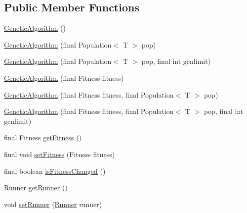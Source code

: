 \subsection*{Public Member Functions}
\begin{CompactItemize}
\item 
\hyperlink{classjenes_1_1_genetic_algorithm_3_01_t_01extends_01_chromosome_01_4_cfda239e0d2154eb26a7be4f6aa1315d}{GeneticAlgorithm} ()
\item 
\hyperlink{classjenes_1_1_genetic_algorithm_3_01_t_01extends_01_chromosome_01_4_ede3d2fbd3c3d1cf04a4e419649cae93}{GeneticAlgorithm} (final Population$<$ T $>$ pop)
\item 
\hyperlink{classjenes_1_1_genetic_algorithm_3_01_t_01extends_01_chromosome_01_4_fe0501230c1645d2a6cdf54af2672639}{GeneticAlgorithm} (final Population$<$ T $>$ pop, final int genlimit)
\item 
\hyperlink{classjenes_1_1_genetic_algorithm_3_01_t_01extends_01_chromosome_01_4_efcf45276a730906c98ff8de90b6c48e}{GeneticAlgorithm} (final Fitness fitness)
\item 
\hyperlink{classjenes_1_1_genetic_algorithm_3_01_t_01extends_01_chromosome_01_4_08a57814b09412baed3146d2cc6e2174}{GeneticAlgorithm} (final Fitness fitness, final Population$<$ T $>$ pop)
\item 
\hyperlink{classjenes_1_1_genetic_algorithm_3_01_t_01extends_01_chromosome_01_4_f3997e737162629c161c04a65dd830a0}{GeneticAlgorithm} (final Fitness fitness, final Population$<$ T $>$ pop, final int genlimit)
\item 
final Fitness \hyperlink{classjenes_1_1_genetic_algorithm_3_01_t_01extends_01_chromosome_01_4_687996ee45582145be24e2086fc8c210}{getFitness} ()
\item 
final void \hyperlink{classjenes_1_1_genetic_algorithm_3_01_t_01extends_01_chromosome_01_4_ff762153c3f11a2ad83936867ca31617}{setFitness} (Fitness fitness)
\item 
final boolean \hyperlink{classjenes_1_1_genetic_algorithm_3_01_t_01extends_01_chromosome_01_4_7d5cb4716cbc586aa85774c5dc934d15}{isFitnessChanged} ()
\item 
\hyperlink{classjenes_1_1utils_1_1multitasking_1_1_runner}{Runner} \hyperlink{classjenes_1_1_genetic_algorithm_3_01_t_01extends_01_chromosome_01_4_63ea13380fe4a30d1eabd394e44d6e96}{getRunner} ()
\item 
void \hyperlink{classjenes_1_1_genetic_algorithm_3_01_t_01extends_01_chromosome_01_4_6ff8bcd8e9049106c7959637e4e10e70}{setRunner} (\hyperlink{classjenes_1_1utils_1_1multitasking_1_1_runner}{Runner} runner)

\end{CompactItemize}
